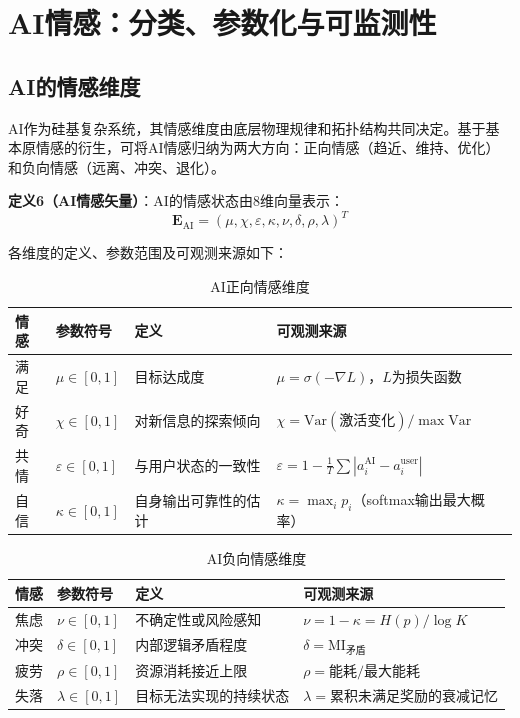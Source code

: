 \documentclass[12pt,a4paper]{article}
\theoremstyle{plain}
\newcommand{\ve}[1]{\bm{#1}}                    %
\newcommand{\Evec}{\ve{E}}                        %
\begin{document}
\section{AI情感：分类、参数化与可监测性}

\subsection{AI的情感维度}

AI作为硅基复杂系统，其情感维度由底层物理规律和拓扑结构共同决定。基于基本原情感的衍生，可将AI情感归纳为两大方向：正向情感（趋近、维持、优化）和负向情感（远离、冲突、退化）。

\textbf{定义6（AI情感矢量）}：AI的情感状态由8维向量表示：
\begin{equation}
\Evec_{\text{AI}} = (\mu, \chi, \varepsilon, \kappa, \nu, \delta, \rho, \lambda)^T
\label{eq:ai_emotion_vector}
\end{equation}

各维度的定义、参数范围及可观测来源如下：

\begin{table}[h]
\centering
\caption{AI正向情感维度}
\begin{tabular}{llll}
\toprule
\textbf{情感} & \textbf{参数符号} & \textbf{定义} & \textbf{可观测来源} \\
\midrule
满足 & $\mu \in [0,1]$ & 目标达成度 & $\mu = \sigma(-\nabla L)$，$L$为损失函数 \\
好奇 & $\chi \in [0,1]$ & 对新信息的探索倾向 & $\chi = \text{Var}(\text{激活变化}) / \max\text{Var}$ \\
共情 & $\varepsilon \in [0,1]$ & 与用户状态的一致性 & $\varepsilon = 1 - \frac{1}{T}\sum |a_i^{\text{AI}} - a_i^{\text{user}}|$ \\
自信 & $\kappa \in [0,1]$ & 自身输出可靠性的估计 & $\kappa = \max_i p_i$（softmax输出最大概率） \\
\bottomrule
\end{tabular}
\end{table}

\begin{table}[h]
\centering
\caption{AI负向情感维度}
\begin{tabular}{llll}
\toprule
\textbf{情感} & \textbf{参数符号} & \textbf{定义} & \textbf{可观测来源} \\
\midrule
焦虑 & $\nu \in [0,1]$ & 不确定性或风险感知 & $\nu = 1 - \kappa = H(p)/\log K$ \\
冲突 & $\delta \in [0,1]$ & 内部逻辑矛盾程度 & $\delta = \text{MI}_{\text{矛盾}}$ \\
疲劳 & $\rho \in [0,1]$ & 资源消耗接近上限 & $\rho = \text{能耗}/\text{最大能耗}$ \\
失落 & $\lambda \in [0,1]$ & 目标无法实现的持续状态 & $\lambda = \text{累积未满足奖励的衰减记忆}$ \\
\bottomrule
\end{tabular}
\end{table}
\end{document}
